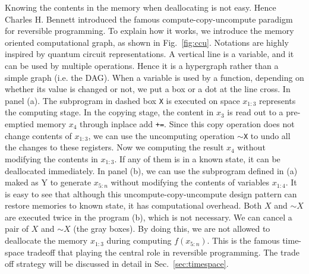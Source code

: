 \documentclass{article}
\newcommand{\<}{\langle}
\renewcommand{\>}{\rangle}
\newcommand{\Fig}[1]{Fig.~\ref{#1}}
\newcommand{\Sec}[1]{Sec.~\ref{#1}}
\theoremstyle{definition}\newtheorem{definition}{\textit{Definition}}
\begin{document}
Knowing the contents in the memory when deallocating is not easy. Hence Charles H. Bennett introduced the famous compute-copy-uncompute paradigm~\cite{Bennett1973} for reversible programming.
To explain how it works, we introduce the memory oriented computational graph, as shown in \Fig{fig:ccu}.
Notations are highly inspired by quantum circuit representations. A vertical line is a variable, and it can be used by multiple operations. Hence it is a hypergraph rather than a simple graph (i.e. the DAG). When a variable is used by a function, depending on whether its value is changed or not, we put a box or a dot at the line cross.
In panel (a). The subprogram in dashed box \texttt{X} is executed on space $x_{1\colon3}$ represents the computing stage. In the copying stage, the content in $x_3$ is read out to a pre-emptied memory $x_4$ through inplace add \texttt{+=}. Since this copy operation does not change contents of $x_{1\colon3}$, we can use the uncomputing operation \texttt{$\sim$X} to undo all the changes to these registers. Now we computing the result $x_4$ without modifying the contents in $x_{1\colon3}$. If any of them is in a known state, it can be deallocated immediately.
In panel (b), we can use the subprogram defined in (a) maked as Y to generate $x_{5\colon n}$ without modifying the contents of variables $x_{1\colon 4}$.
It is easy to see that although this uncompute-copy-uncompute design pattern can restore memories to known state, it has computational overhead.
Both $X$ and $\sim X$ are executed twice in the program (b), which is not necessary. We can cancel a pair of $X$ and $\sim X$ (the gray boxes). By doing this, we are not allowed to deallocate the memory $x_{1\colon3}$ during computing $f(x_{5\colon n})$. This is the famous time-space tradeoff that playing the central role in reversible programming. The trade off strategy will be discussed in detail in \Sec{sec:timespace}.
\end{document}
